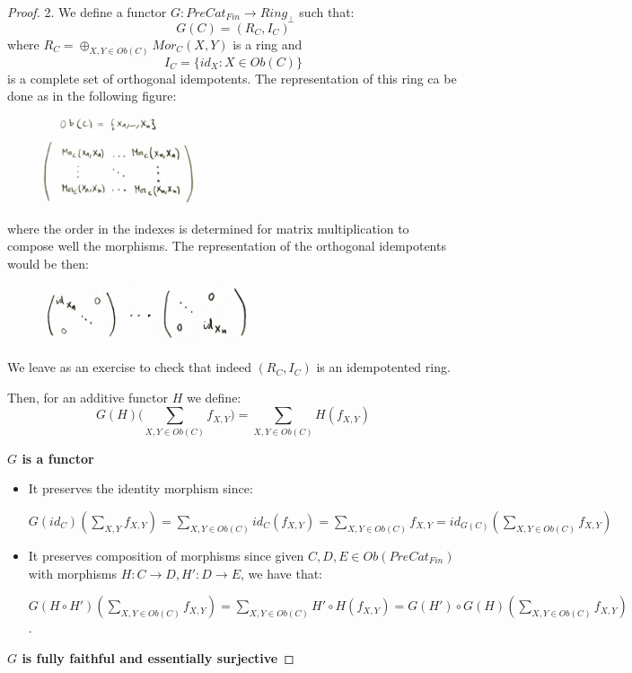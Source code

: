 \begin{proof}
2. We define a functor $G:PreCat_{Fin} \to Ring_{\perp}$ such that: $$G(C) = (R_C,I_C)$$ where $R_C = \oplus_{X,Y \in Ob(C)} Mor_C(X,Y)$ is a ring and $$I_C = \{id_X:X \in Ob(C)\}$$ is a complete set of orthogonal idempotents. The representation of this ring ca be done as in the following figure:  \begin{figure}[H]
\centering
\includegraphics[width=4.5cm]{images/matrix.jpg}
\end{figure} where the order in the indexes is determined for matrix multiplication to compose well the morphisms. The representation of the orthogonal idempotents would be then: \begin{figure}[H]
\centering
\includegraphics[width=6cm]{images/idem.jpg}
\end{figure}

We leave as an exercise to check that indeed $(R_C,I_C)$ is an idempotented ring. 

Then, for an additive functor $H$ we define: $$G(H)\Big(\sum_{X,Y \in Ob(C)} f_{X,Y}\Big) = \sum_{X,Y \in Ob(C)} H(f_{X,Y})$$ 

\textbf{$G$ is a functor}

\begin{itemize}
\item It preserves the identity morphism since: 

$G(id_C)(\sum_{X,Y} f_{X,Y}) = \sum_{X,Y \in Ob(C)} id_C(f_{X,Y}) = \sum_{X,Y \in Ob(C)} f_{X,Y} = id_{G(C)}(\sum_{X,Y \in Ob(C)} f_{X,Y})$
\item It preserves composition of morphisms since given $C,D,E \in Ob(PreCat_{Fin})$ with morphisms $H:C \to D,H':D \to E$, we have that:

$G(H \circ H')(\sum_{X,Y \in Ob(C)} f_{X,Y}) = \sum_{X,Y \in Ob(C)} H' \circ H(f_{X,Y}) = G(H') \circ  G(H)(\sum_{X,Y \in Ob(C)} f_{X,Y})$.
\end{itemize}

\textbf{$G$ is fully faithful and essentially surjective} 


\end{proof}
